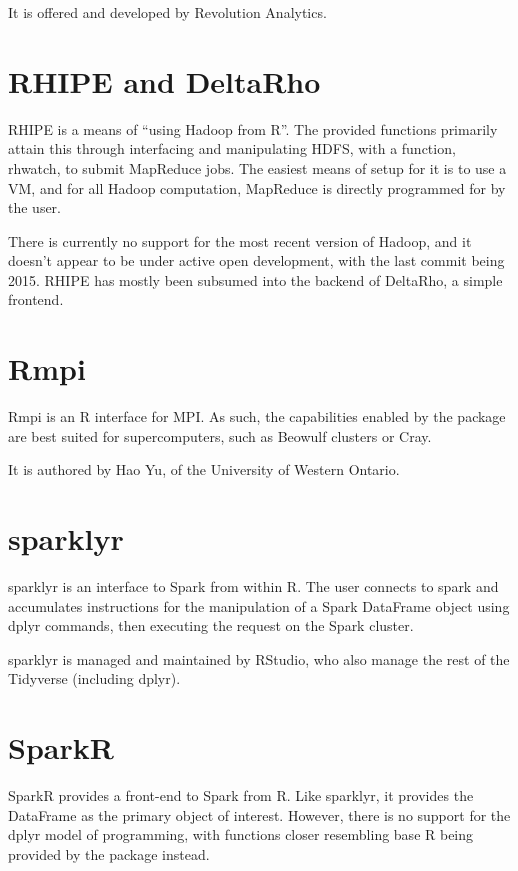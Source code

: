 \documentclass[10pt,a4paper]{article}
\begin{document}
It is offered and developed by Revolution Analytics.

\section{RHIPE and DeltaRho}
\label{sec:rhipe-deltarho}

RHIPE is a means of ``using Hadoop from R''\cite{deltarho:_rhipe}. The
provided functions primarily attain this through interfacing and
manipulating HDFS, with a function, rhwatch, to submit MapReduce jobs.
The easiest means of setup for it is to use a VM, and for all Hadoop
computation, MapReduce is directly programmed for by the user.

There is currently no support for the most recent version of Hadoop,
and it doesn't appear to be under active open development, with the
last commit being 2015. RHIPE has mostly been subsumed into the
backend of DeltaRho, a simple frontend.

\section{Rmpi}
\label{sec:rmpi}

Rmpi is an R interface for MPI\cite{yu02:_rmpi}. As such, the
capabilities enabled by the package are best suited for
supercomputers, such as Beowulf clusters or Cray.

It is authored by Hao Yu, of the University of Western Ontario.

\section{sparklyr}
\label{sec:sparklyr}

sparklyr is an interface to Spark from within R\cite{luraschi20}. The user connects to
spark and accumulates instructions for the manipulation of a Spark
DataFrame object using dplyr commands, then executing the request on
the Spark cluster.

sparklyr is managed and maintained by RStudio, who also manage the
rest of the Tidyverse (including dplyr).

\section{SparkR}
\label{sec:sparkr}

SparkR provides a front-end to Spark from
R\cite{venkataraman20:_spark}. Like sparklyr, it provides the
DataFrame as the primary object of interest. However, there is no
support for the dplyr model of programming, with functions closer
resembling base R being provided by the package instead.
\end{document}
